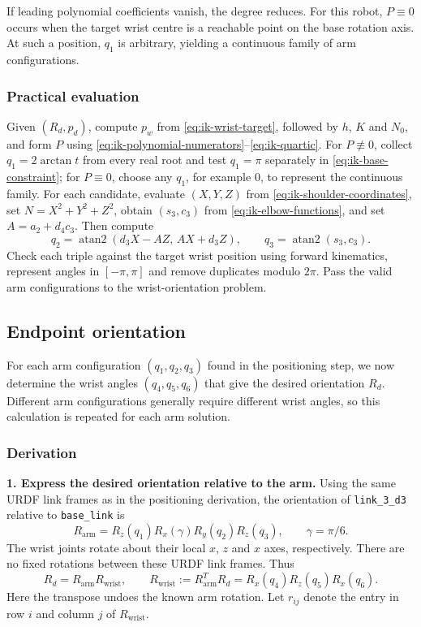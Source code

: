 If leading polynomial coefficients vanish, the degree reduces.
For this robot, \(P\equiv0\) occurs when the target wrist centre is a reachable point on the base rotation axis. 
At such a position, \(q_1\) is arbitrary, yielding a continuous family of arm configurations.

\subsubsection*{Practical evaluation}

Given $(R_d,p_d)$, compute $p_w$ from \eqref{eq:ik-wrist-target}, followed by
$h$, $K$ and $N_0$, and form $P$ using \eqref{eq:ik-polynomial-numerators}--\eqref{eq:ik-quartic}.
For $P\not\equiv0$, collect $q_1=2\arctan t$ from every real root and test
$q_1=\pi$ separately in \eqref{eq:ik-base-constraint}; for $P\equiv0$, choose
any $q_1$, for example $0$, to represent the continuous family.
For each candidate, evaluate $(X,Y,Z)$ from \eqref{eq:ik-shoulder-coordinates},
set $N=X^2+Y^2+Z^2$, obtain $(s_3,c_3)$ from \eqref{eq:ik-elbow-functions},
and set $A=a_2+d_4c_3$. Then compute
\[
 q_2=\operatorname{atan2}(d_3X-AZ,\,AX+d_3Z),
 \qquad q_3=\operatorname{atan2}(s_3,c_3).
\]
Check each triple against the target wrist position using forward kinematics,
represent angles in $[-\pi,\pi]$ and remove duplicates modulo $2\pi$.
Pass the valid arm configurations to the wrist-orientation problem.

\subsection{Endpoint orientation}
\label{sec:ik-orientation}

For each arm configuration $(q_1,q_2,q_3)$ found in the positioning step,
we now determine the wrist angles $(q_4,q_5,q_6)$ that give the desired
orientation $R_d$. Different arm configurations generally require different
wrist angles, so this calculation is repeated for each arm solution.

\subsubsection*{Derivation}

\textbf{1. Express the desired orientation relative to the arm.}
Using the same URDF link frames as in the positioning derivation, the
orientation of \texttt{link\_3\_d3} relative to \texttt{base\_link} is
\begin{equation}
 R_{\text{arm}}=R_z(q_1)R_x(\gamma)R_y(q_2)R_z(q_3),
 \qquad \gamma=\pi/6.
 \label{eq:ik-arm-orientation}
\end{equation}
The wrist joints rotate about their local $x$, $z$ and $x$ axes, respectively.
There are no fixed rotations between these URDF link frames. Thus
\begin{equation}
 R_d=R_{\text{arm}}R_{\text{wrist}},
 \qquad
 R_{\text{wrist}}:=R_{\text{arm}}^TR_d
                 =R_x(q_4)R_z(q_5)R_x(q_6).
 \label{eq:ik-wrist-orientation}
\end{equation}
Here the transpose undoes the known arm rotation. Let $r_{ij}$ denote the
entry in row $i$ and column $j$ of $R_{\text{wrist}}$.

